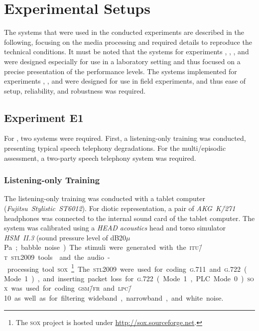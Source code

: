 

\chapter{Experimental Setups}\label{appendix:setups}
The systems that were used in the conducted experiments are described in the following, focusing on the media processing and required details to reproduce the technical conditions.
It must be noted that the systems for experiments , \EIIa{}, \EIIb{}, and  were designed especially for use in a laboratory setting and thus focused on a precise presentation of the performance levels.
The systems implemented for experiments , , and  were designed for use in field experiments, and thus ease of setup, reliability, and robustness was required.

\section{Experiment E1}
For , two systems were required.
First, a listening-only training was conducted, presenting typical speech telephony degradations.
For the multi\-/episodic assessment, a two-party speech telephony system was required.

\subsection{Listening-only Training}
The listening-only training was conducted with a tablet computer (\emph{Fujitsu~Stylistic~ST6012}).
For diotic representation, a pair of \emph{AKG~K\=/271} headphones was connected to the internal sound card of the tablet computer.
The system was calibrated using a \emph{HEAD acoustics} head and torso simulator \emph{HSM~II.3} (sound pressure level of \unit[75]{dB20$\mu$Pa}; babble noise).
The stimuli were generated with the \textsc{\lowercase{ITU\=/T}~\lowercase{STL2009}} tools \citep{itu-t_recommendation_g.191_software_2010} and the audio-processing tool \textsc{\lowercase{SOX}}\footnote{The \textsc{\lowercase{SOX}} project is hosted under \url{http://sox.sourceforge.net}.}.
The \textsc{\lowercase{STL2009}} were used for coding \textsc{\lowercase{G.711}} and \textsc{\lowercase{G.722}}~(Mode~1), and inserting packet loss for \textsc{\lowercase{G.722}}~(Mode~1, \acs{PLC} Mode~0).
\textsc{\lowercase{SOX}} was used for coding \textsc{\lowercase{GSM\=/FR}} and \textsc{\lowercase{LPC\=/10}} as well as for filtering wideband, narrowband, and white noise.

